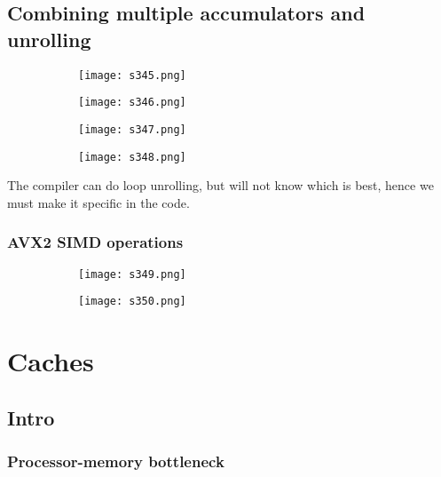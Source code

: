 \documentclass[8pt]{extreport}
\begin{document}
\section{Combining multiple accumulators and unrolling}
\begin{figure}[H]
\begin{subfigure}[b]{0.4\linewidth}
\texttt{[image: s345.png]}
\end{subfigure}
\begin{subfigure}[b]{0.4\linewidth}
\texttt{[image: s346.png]}
\end{subfigure}
\begin{subfigure}[b]{0.4\linewidth}
\texttt{[image: s347.png]}
\end{subfigure}
\begin{subfigure}[b]{0.4\linewidth}
\texttt{[image: s348.png]}
\end{subfigure}
\end{figure}
The compiler can do loop unrolling, but will not know which is best, hence we must make it specific in the code.

\subsection{AVX2 SIMD operations}
\begin{figure}[H]
\begin{subfigure}[b]{0.4\linewidth}
\texttt{[image: s349.png]}
\end{subfigure}
\begin{subfigure}[b]{0.4\linewidth}
\texttt{[image: s350.png]}
\end{subfigure}
\end{figure}


\chapter{Caches}

\section{Intro}

\subsection{Processor-memory bottleneck}
\end{document}
